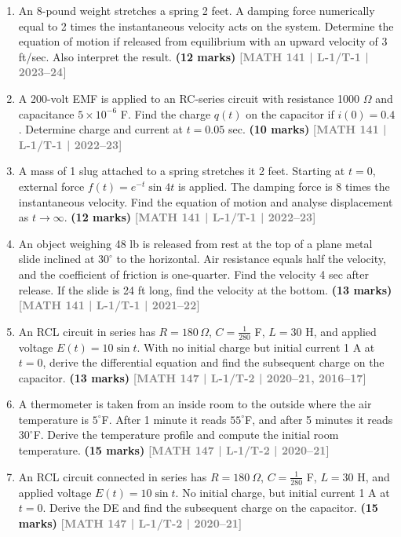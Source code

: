 \documentclass[12pt,a4paper]{article}
\newcommand{\yr}[1]{\hfill\textcolor{gray}{\small\textbf{[#1]}}}
\newcommand{\mk}[1]{\textcolor{orange!70!black}{\small\textbf{(#1 marks)}}}
\begin{document}
\begin{enumerate}\item An 8-pound weight stretches a spring 2 feet. A damping force numerically equal to 2 times the instantaneous velocity acts on the system. Determine the equation of motion if released from equilibrium with an upward velocity of 3 ft/sec. Also interpret the result.
\mk{12} \yr{MATH 141 | L-1/T-1 | 2023--24}

\item A 200-volt EMF is applied to an RC-series circuit with resistance 1000 $\Omega$ and capacitance $5\times10^{-6}$ F. Find the charge $q(t)$ on the capacitor if $i(0)=0.4$. Determine charge and current at $t=0.05$ sec.
\mk{10} \yr{MATH 141 | L-1/T-1 | 2022--23}

\item A mass of 1 slug attached to a spring stretches it 2 feet. Starting at $t=0$, external force $f(t)=e^{-t}\sin 4t$ is applied. The damping force is 8 times the instantaneous velocity. Find the equation of motion and analyse displacement as $t\to\infty$.
\mk{12} \yr{MATH 141 | L-1/T-1 | 2022--23}

\item An object weighing 48 lb is released from rest at the top of a plane metal slide inclined at $30^{\circ}$ to the horizontal. Air resistance equals half the velocity, and the coefficient of friction is one-quarter. Find the velocity 4 sec after release. If the slide is 24 ft long, find the velocity at the bottom.
\mk{13} \yr{MATH 141 | L-1/T-1 | 2021--22}

\item An RCL circuit in series has $R=180\,\Omega$, $C=\tfrac{1}{280}$ F, $L=30$ H, and applied voltage $E(t)=10\sin t$. With no initial charge but initial current 1 A at $t=0$, derive the differential equation and find the subsequent charge on the capacitor.
\mk{13} \yr{MATH 147 | L-1/T-2 | 2020--21, 2016--17}

\item A thermometer is taken from an inside room to the outside where the air temperature is $5^{\circ}$F. After 1 minute it reads $55^{\circ}$F, and after 5 minutes it reads $30^{\circ}$F. Derive the temperature profile and compute the initial room temperature.
\mk{15} \yr{MATH 147 | L-1/T-2 | 2020--21}

\item An RCL circuit connected in series has $R=180\ \Omega$, $C=\tfrac{1}{280}$ F, $L=30$ H, and applied voltage $E(t)=10\sin t$. No initial charge, but initial current 1 A at $t=0$. Derive the DE and find the subsequent charge on the capacitor.
\mk{15} \yr{MATH 147 | L-1/T-2 | 2020--21}


\end{enumerate}
\end{document}
